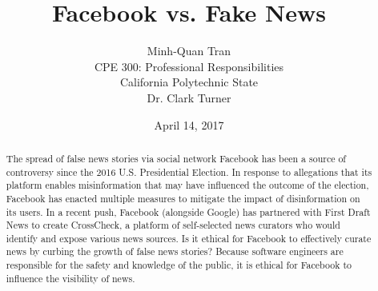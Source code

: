 


\title{\vfill Facebook vs. Fake News\\
\vspace{8pt}
\normalsize{}
}

\author{Minh-Quan Tran\\
\normalsize{CPE 300: Professional Responsibilities}\\
\normalsize{California Polytechnic State}\\
\normalsize{Dr. Clark Turner}
}

\date{April 14, 2017}

\maketitle


\vfill

\begin{abstract}
The spread of false news stories via social network Facebook has been a source of controversy since the 2016 U.S. Presidential Election. \cite{telegraph_fake_news} In response to allegations that its platform enables misinformation that may have influenced the outcome of the election, \cite{tc_snowden_fb} Facebook has enacted multiple measures to mitigate the impact of disinformation on its users. \cite{fb_reduce_clickbait,fb_addressing_hoaxes,fb_spot_fake_news} In a recent push, Facebook (alongside Google) has partnered with First Draft News to create CrossCheck, a platform of self-selected news curators who would identify and expose various news sources. \cite{crosscheck_launch} Is it ethical for Facebook to effectively curate news by curbing the growth of false news stories? Because software engineers are responsible for the safety and knowledge of the public, \cite{se_code} it is ethical for Facebook to influence the visibility of news.
\end{abstract}

\thispagestyle{empty} 
\pagebreak